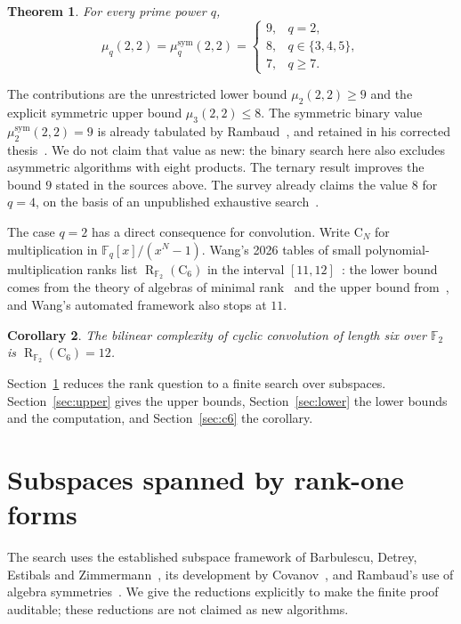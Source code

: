 \documentclass[11pt]{amsart}
\newtheorem{theorem}{Theorem}[section]
\newtheorem{corollary}[theorem]{Corollary}
\theoremstyle{definition}
\theoremstyle{remark}
\newcommand{\F}{\mathbb F}
\newcommand{\R}{\operatorname{R}}
\begin{document}
\begin{theorem}\label{thm:main}
For every prime power $q$,
\[
 \mu_q(2,2)=\mu_q^{\mathrm{sym}}(2,2)=\begin{cases}9,&q=2,\\ 8,&q\in\{3,4,5\},\\ 7,&q\ge7.\end{cases}
\]
\end{theorem}

The contributions are the unrestricted lower bound $\mu_2(2,2)\ge9$ and the explicit symmetric upper bound $\mu_3(2,2)\le8$. The symmetric binary value $\mu_2^{\mathrm{sym}}(2,2)=9$ is already tabulated by Rambaud~\cite[Tables~1--2]{Rambaud2014}, and retained in his corrected thesis~\cite[Table~I.2.1 and \S II.3.1]{RambaudThesis}. We do not claim that value as new: the binary search here also excludes asymmetric algorithms with eight products. The ternary result improves the bound $9$ stated in the sources above. The survey already claims the value $8$ for $q=4$, on the basis of an unpublished exhaustive search~\cite[\S8.2]{BalletSurvey}.

The case $q=2$ has a direct consequence for convolution. Write $\mathrm C_N$ for multiplication in $\F_q[x]/(x^N-1)$. Wang's 2026 tables of small polynomial-multiplication ranks list $\R_{\F_2}(\mathrm C_6)$ in the interval $[11,12]$~\cite[Table~5]{Wang2026}: the lower bound comes from the theory of algebras of minimal rank~\cite{AGW1988,Blaser2005} and the upper bound from~\cite{BDEZ2012}, and Wang's automated framework also stops at $11$.

\begin{corollary}\label{cor:c6}
The bilinear complexity of cyclic convolution of length six over $\F_2$ is $\R_{\F_2}(\mathrm C_6)=12$.
\end{corollary}

Section~\ref{sec:setup} reduces the rank question to a finite search over subspaces. Section~\ref{sec:upper} gives the upper bounds, Section~\ref{sec:lower} the lower bounds and the computation, and Section~\ref{sec:c6} the corollary.

\section{Subspaces spanned by rank-one forms}\label{sec:setup}

The search uses the established subspace framework of Barbulescu, Detrey, Estibals and Zimmermann~\cite{BDEZ2012}, its development by Covanov~\cite[Propositions~6 and~14]{Covanov2019}, and Rambaud's use of algebra symmetries~\cite{Rambaud2014}. We give the reductions explicitly to make the finite proof auditable; these reductions are not claimed as new algorithms.
\end{document}
